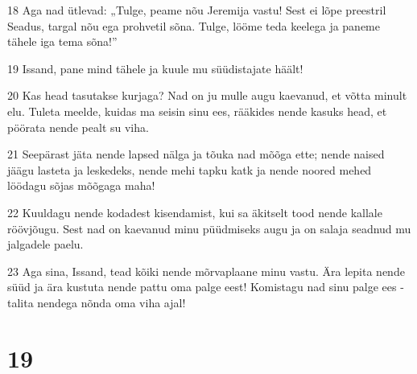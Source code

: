 \par 18 Aga nad ütlevad: „Tulge, peame nõu Jeremija vastu! Sest ei lõpe preestril Seadus, targal nõu ega prohvetil sõna. Tulge, lööme teda keelega ja paneme tähele iga tema sõna!”
\par 19 Issand, pane mind tähele ja kuule mu süüdistajate häält!
\par 20 Kas head tasutakse kurjaga? Nad on ju mulle augu kaevanud, et võtta minult elu. Tuleta meelde, kuidas ma seisin sinu ees, rääkides nende kasuks head, et pöörata nende pealt su viha.
\par 21 Seepärast jäta nende lapsed nälga ja tõuka nad mõõga ette; nende naised jäägu lasteta ja leskedeks, nende mehi tapku katk ja nende noored mehed löödagu sõjas mõõgaga maha!
\par 22 Kuuldagu nende kodadest kisendamist, kui sa äkitselt tood nende kallale röövjõugu. Sest nad on kaevanud minu püüdmiseks augu ja on salaja seadnud mu jalgadele paelu.
\par 23 Aga sina, Issand, tead kõiki nende mõrvaplaane minu vastu. Ära lepita nende süüd ja ära kustuta nende pattu oma palge eest! Komistagu nad sinu palge ees - talita nendega nõnda oma viha ajal!

\chapter{19}

